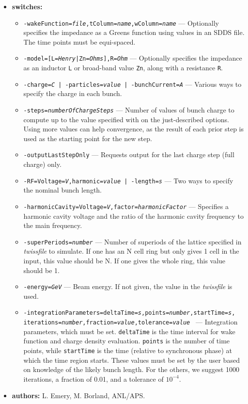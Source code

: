 \documentclass[11pt]{article}
\begin{document}
\begin{itemize}
\item {\bf switches:}
\begin{itemize}
\item {\tt -wakeFunction={\em file},tColumn={\em name},wColumn={\em name}} --- Optionally
 specifies the impedance as a Greens function using values in an SDDS file.  The time points
 must be equi-spaced.
\item {\tt -model=[L={\em Henry}|Zn={\em Ohms}],R={\em Ohm}} --- Optionally specifies the
 impedance as an inductor {\tt L} or broad-band value {\tt  Zn}, along with  a resistance {\tt R}.
\item {\tt -charge={\em C} | -particles={\em value} | -bunchCurrent={\em A}} --- Various 
 ways to specify the charge in each bunch.
\item {\tt -steps={\em numberOfChargeSteps}} --- Number of values of bunch charge to compute 
 up to the value specified with on the just-described options.  Using more values can help
 convergence, as the result of each prior step is used as the starting point for the new step.
\item {\tt -outputLastStepOnly}  --- Requests output for the last charge step (full charge) only.
\item {\tt -RF=Voltage={\em V},harmonic={\em value} | -length={\em s}} --- Two ways to specify 
 the nominal bunch length.
\item {\tt -harmonicCavity=Voltage={\em V},factor={\em harmonicFactor}} --- Specifies a harmonic
 cavity voltage and the ratio of the harmonic cavity frequency to the main frequency.
\item {\tt -superPeriods={\em number}} --- Number of superiods of the lattice specified in
 {\em twissfile} to simulate.  If one has an N cell ring but only gives 1 cell in the input,
 this value should be N.  If one gives the whole ring, this value should be 1.
\item {\tt -energy={\em GeV}} --- Beam energy. If not given, the value in the {\em twissfile} 
 is used.
\item {\tt -integrationParameters=deltaTime={\em s},points={\em number},startTime={\em s},}\\
 {\tt iterations={\em number},fraction={\em value},tolerance={\em value} } --- Integration 
 parameters, which must be set.  {\tt deltaTime} is the time interval for wake function and
 charge density evaluation.  {\tt points} is the number of time points, while {\tt startTime}
 is the time (relative to synchronous phase) at which the time region starts.  These values
 must be set by the user based on knowledge of the likely bunch length.  For the others, 
 we suggest 1000 iterations, a fraction of 0.01, and a tolerance of $10^{-4}$. 
\end{itemize}

\item {\bf authors:} L. Emery, M. Borland, ANL/APS.
\end{itemize}
\end{document}
